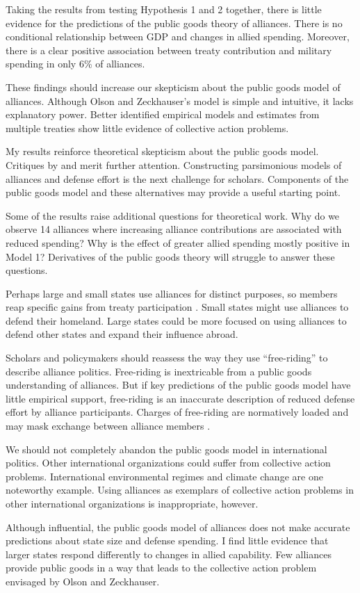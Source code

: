 \documentclass[12pt]{article}
\begin{document}
Taking the results from testing Hypothesis 1 and 2 together, there is little evidence for the predictions of the public goods theory of alliances. 
There is no conditional relationship between GDP and changes in allied spending.
Moreover, there is a clear positive association between treaty contribution and military spending in only 6\% of alliances. 


These findings should increase our skepticism about the public goods model of alliances. 
Although Olson and Zeckhauser's model is simple and intuitive, it lacks explanatory power. 
Better identified empirical models and estimates from multiple treaties show little evidence of collective action problems. 

My results reinforce theoretical skepticism about the public goods model. 
Critiques by \citet{Palmer1990} and \citet{SandlerHartley2001} merit further attention. 
Constructing parsimonious models of alliances and defense effort is the next challenge for scholars. 
Components of the public goods model and these alternatives may provide a useful starting point. 


Some of the results raise additional questions for theoretical work. 
Why do we observe 14 alliances where increasing alliance contributions are associated with reduced spending?
Why is the effect of greater allied spending mostly positive in Model 1? 
Derivatives of the public goods theory will struggle to answer these questions. 


Perhaps large and small states use alliances for distinct purposes, so members reap specific gains from treaty participation \citep{Morrow1991}. 
Small states might use alliances to defend their homeland. 
Large states could be more focused on using alliances to defend other states and expand their influence abroad. 


Scholars and policymakers should reassess the way they use ``free-riding'' to describe alliance politics. 
Free-riding is inextricable from a public goods understanding of alliances.
But if key predictions of the public goods model have little empirical support, free-riding is an inaccurate description of reduced defense effort by alliance participants.  
Charges of free-riding are normatively loaded and may mask exchange between alliance members \citep{Lanoszka2015}. 


We should not completely abandon the public goods model in international politics. 
Other international organizations could suffer from collective action problems.
International environmental regimes and climate change are one noteworthy example.  
Using alliances as exemplars of collective action problems in other international organizations is inappropriate, however. 


Although influential, the public goods model of alliances does not make accurate predictions about state size and defense spending. 
I find little evidence that larger states respond differently to changes in allied capability. 
Few alliances provide public goods in a way that leads to the collective action problem envisaged by Olson and Zeckhauser. 



\singlespace


 
\end{document}
